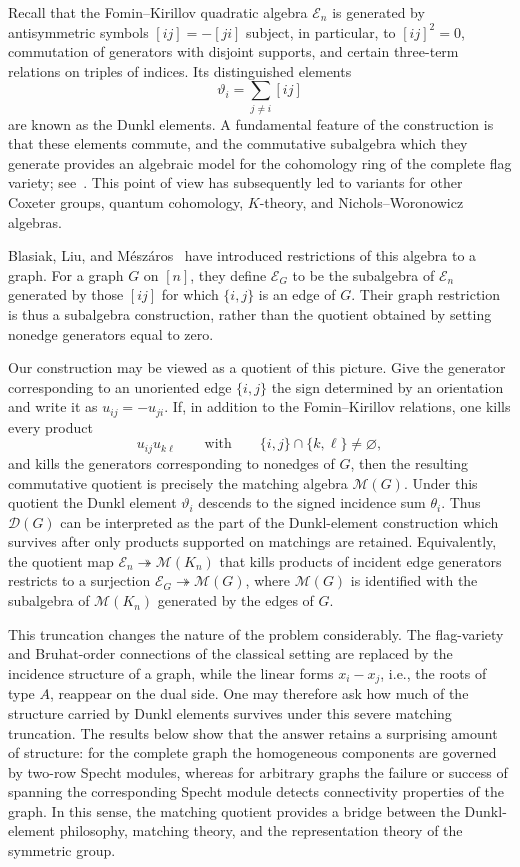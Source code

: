 \documentclass[12pt]{amsart}
\theoremstyle{definition}
\theoremstyle{remark}
\begin{document}
Recall that the
Fomin--Kirillov quadratic algebra $\mathcal E_n$ is generated by
antisymmetric symbols $[ij]=-[ji]$ subject, in particular, to
$[ij]^2=0$, commutation of generators with disjoint supports, and
certain three-term relations on triples of indices.  Its distinguished
elements
\[
   \vartheta_i=\sum_{j\ne i}[ij]
\]
are known as the Dunkl elements.  A fundamental feature of the construction is
that these elements commute, and the commutative subalgebra which they
generate provides an algebraic model for the cohomology ring of the
complete flag variety; see~\cite{FK}.  This point of view has subsequently
led to variants for other Coxeter groups, quantum cohomology, $K$-theory,
and Nichols--Woronowicz algebras.

Blasiak, Liu, and M\'esz\'aros~\cite[Definition~2.3]{BLM} have
introduced restrictions of this algebra to a graph.  For a graph $G$
on $[n]$, they define $\mathcal E_G$ to be the subalgebra of
$\mathcal E_n$ generated by those $[ij]$ for which $\{i,j\}$ is an edge
of $G$.  Their graph restriction is thus a subalgebra construction,
rather than the quotient obtained by setting nonedge generators equal
to zero.

Our construction may be viewed as a
quotient of this picture.  Give the generator
corresponding to an unoriented edge $\{i,j\}$ the sign determined by an
orientation and write it as $u_{ij}=-u_{ji}$.  If, in addition to the
Fomin--Kirillov relations, one kills every product
\[
     u_{ij}u_{k\ell}
     \qquad\text{with}\qquad
     \{i,j\}\cap\{k,\ell\}\ne\varnothing,
\]
and kills the generators corresponding to nonedges of $G$, then the
resulting commutative quotient is precisely the matching algebra
$\mathcal M(G)$.  Under this quotient the Dunkl element
$\vartheta_i$ descends to the signed incidence sum $\theta_i$.
Thus $\mathcal D(G)$ can be interpreted as the part of the
Dunkl-element construction which survives after only products supported
on matchings are retained.
Equivalently, the quotient map
$\mathcal E_n\twoheadrightarrow\mathcal M(K_n)$ that kills products of
incident edge generators restricts to a surjection
$\mathcal E_G\twoheadrightarrow\mathcal M(G)$, where $\mathcal M(G)$ is
identified with the subalgebra of $\mathcal M(K_n)$ generated by the
edges of $G$.

This truncation changes the nature of the problem considerably.
The flag-variety and Bruhat-order connections of the classical setting
are replaced by the incidence structure of a graph, while the linear
forms $x_i-x_j$, i.e., the roots of type $A$, reappear on the dual side.
One may therefore ask how much of the structure carried by Dunkl
elements survives under this severe matching truncation.  The results
below show that the answer retains a surprising amount of structure:
for the complete graph the homogeneous components are governed by
two-row Specht modules, whereas for arbitrary graphs the failure or
success of spanning the corresponding Specht module detects
connectivity properties of the graph.  In this sense, the matching
quotient provides a bridge between the Dunkl-element philosophy,
matching theory, and the representation theory of the symmetric group.
\end{document}
